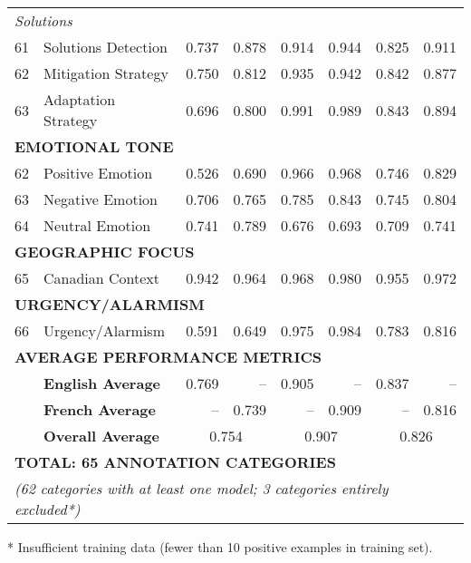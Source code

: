 \documentclass[12pt]{article}
\begin{document}
{\begin{longtable}{p{0.4cm}p{5.5cm}rrrrrr}
\multicolumn{8}{l}{\textit{Solutions}} \\
61 & Solutions Detection & 0.737 & 0.878 & 0.914 & 0.944 & 0.825 & 0.911 \\
62 & Mitigation Strategy & 0.750 & 0.812 & 0.935 & 0.942 & 0.842 & 0.877 \\
63 & Adaptation Strategy & 0.696 & 0.800 & 0.991 & 0.989 & 0.843 & 0.894 \\
\multicolumn{8}{l}{\cellcolor{gray!10}\textbf{EMOTIONAL TONE}} \\
\midrule
62 & Positive Emotion & 0.526 & 0.690 & 0.966 & 0.968 & 0.746 & 0.829 \\
63 & Negative Emotion & 0.706 & 0.765 & 0.785 & 0.843 & 0.745 & 0.804 \\
64 & Neutral Emotion & 0.741 & 0.789 & 0.676 & 0.693 & 0.709 & 0.741 \\
\multicolumn{8}{l}{\cellcolor{gray!10}\textbf{GEOGRAPHIC FOCUS}} \\
\midrule
65 & Canadian Context & 0.942 & 0.964 & 0.968 & 0.980 & 0.955 & 0.972 \\
\multicolumn{8}{l}{\cellcolor{gray!10}\textbf{URGENCY/ALARMISM}} \\
\midrule
66 & Urgency/Alarmism & 0.591 & 0.649 & 0.975 & 0.984 & 0.783 & 0.816 \\
\multicolumn{8}{l}{\cellcolor{gray!20}\textbf{AVERAGE PERFORMANCE METRICS}} \\
& \textbf{English Average} & 0.769 & -- & 0.905 & -- & 0.837 & -- \\
& \textbf{French Average} & -- & 0.739 & -- & 0.909 & -- & 0.816 \\
& \textbf{Overall Average} & \multicolumn{2}{c}{0.754} & \multicolumn{2}{c}{0.907} & \multicolumn{2}{c}{0.826} \\
\midrule
\multicolumn{8}{l}{\cellcolor{gray!20}\textbf{TOTAL: 65 ANNOTATION CATEGORIES}} \\
\multicolumn{8}{l}{\cellcolor{gray!20}\textit{(62 categories with at least one model; 3 categories entirely excluded*)}} \\
\end{longtable}
\vspace{0.5em}
\noindent\footnotesize
* Insufficient training data (fewer than 10 positive examples in training set).
} %
\endlandscape
\landscape
\end{document}

